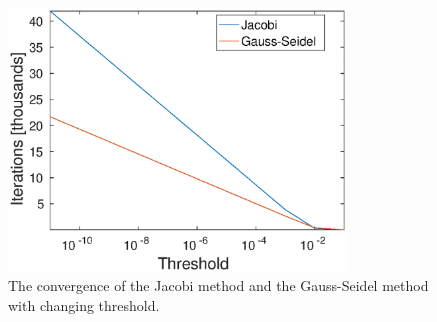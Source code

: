 \begin{figure}
\centering
\includegraphics[width = 0.8\textwidth]{fig/itd_jac_gs.eps}
\caption{The convergence of the Jacobi method and the Gauss-Seidel method with changing threshold.}
\label{fig:itd}
\end{figure}